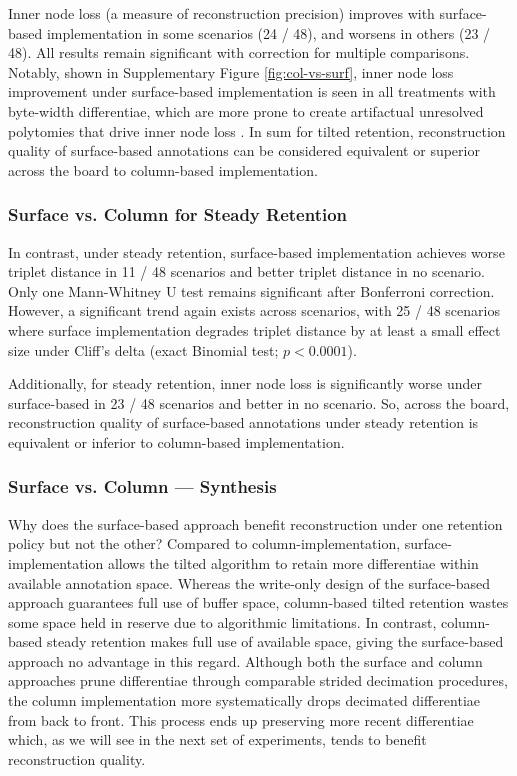 Inner node loss (a measure of reconstruction precision) improves with surface-based implementation in some scenarios (24 / 48), and worsens in others (23 / 48).
All results remain significant with correction for multiple comparisons.
Notably, shown in Supplementary Figure \ref{fig:col-vs-surf}, inner node loss improvement under surface-based implementation is seen in all treatments with byte-width differentiae, which are more prone to create artifactual unresolved polytomies that drive inner node loss \citep{moreno2024supplemental}.
In sum for tilted retention, reconstruction quality of surface-based annotations can be considered equivalent or superior across the board to column-based implementation.

\subsubsection{Surface vs. Column for Steady Retention}

In contrast, under steady retention, surface-based implementation achieves worse triplet distance in 11 / 48 scenarios and better triplet distance in no scenario.
Only one Mann-Whitney U test remains significant after Bonferroni correction.
However, a significant trend again exists across scenarios, with 25 / 48 scenarios where surface implementation degrades triplet distance by at least a small effect size under Cliff's delta (exact Binomial test; $p < 0.0001$).

Additionally, for steady retention, inner node loss is significantly worse under surface-based in 23 / 48 scenarios and better in no scenario.
So, across the board, reconstruction quality of surface-based annotations under steady retention is equivalent or inferior to column-based implementation.

\subsubsection{Surface vs. Column --- Synthesis}

Why does the surface-based approach benefit reconstruction under one retention policy but not the other?
Compared to column-implementation, surface-implementation allows the tilted algorithm to retain more differentiae within available annotation space.
Whereas the write-only design of the surface-based approach guarantees full use of buffer space, column-based tilted retention wastes some space held in reserve due to algorithmic limitations.
In contrast, column-based steady retention makes full use of available space, giving the surface-based approach no advantage in this regard.
Although both the surface and column approaches prune differentiae through comparable strided decimation procedures, the column implementation more systematically drops decimated differentiae from back to front.
This process ends up preserving more recent differentiae which, as we will see in the next set of experiments, tends to benefit reconstruction quality.


